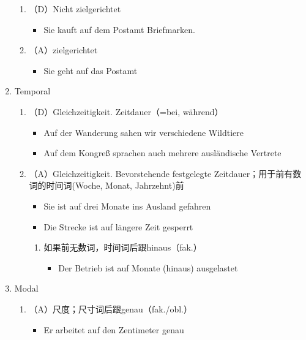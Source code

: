 \documentclass[UTF8]{report}
\begin{document}
\begin{enumerate}
\begin{enumerate}
        \item （D）Nicht zielgerichtet
        \begin{itemize}
            \item Sie kauft auf dem Postamt Briefmarken.
        \end{itemize}
        \item （A）zielgerichtet
        \begin{itemize}
            \item Sie geht auf das Postamt
        \end{itemize}
    \end{enumerate}
    \item Temporal
    \begin{enumerate}
        \item （D）Gleichzeitigkeit. Zeitdauer（=bei, während）
        \begin{itemize}
            \item Auf der Wanderung sahen wir verschiedene Wildtiere
            \item Auf dem Kongreß sprachen auch mehrere ausländische Vertrete
        \end{itemize}
        \item （A）Gleichzeitigkeit. Bevorstehende festgelegte Zeitdauer；用于前有数词的时间词(Woche, Monat, Jahrzehnt)前
        \begin{itemize}
            \item Sie ist auf drei Monate ins Ausland gefahren
            \item Die Strecke ist auf längere Zeit gesperrt
        \end{itemize}
        \begin{enumerate}
            \item 如果前无数词，时间词后跟hinaus（fak.）
            \begin{itemize}
                \item Der Betrieb ist auf Monate (hinaus) ausgelastet
            \end{itemize}
        \end{enumerate}
    \end{enumerate}
    \item Modal
    \begin{enumerate}
        \item （A）尺度；尺寸词后跟genau（fak./obl.）
        \begin{itemize}
            \item Er arbeitet auf den Zentimeter genau

\end{itemize}
\end{enumerate}
\end{enumerate}
\end{document}
